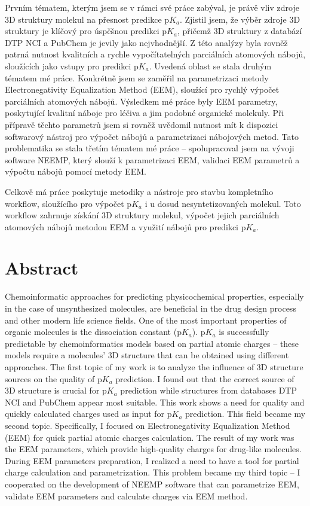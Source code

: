 \documentclass[11pt,b5paper,oneside,final]{book}
\begin{document}
Prvním tématem, kterým jsem se v rámci své práce zabýval, je právě vliv zdroje
3D struktury molekul na přesnost predikce p$K_a$. Zjistil jsem, že výběr zdroje
3D struktury je klíčový pro úspěšnou predikci p$K_a$, přičemž 3D struktury
z databází DTP NCI a PubChem je jevily jako nejvhodnější. Z této analýzy byla
rovněž patrná nutnost kvalitních a rychle vypočítatelných parciálních atomových
nábojů, sloužících jako vstupy pro predikci p$K_a$. Uvedená oblast se stala
druhým tématem mé práce. Konkrétně jsem se zaměřil na parametrizaci metody
Electronegativity Equalization Method (EEM), sloužící pro rychlý vý\-po\-čet
parciálních atomových nábojů. Výsledkem mé práce byly EEM parametry,
poskytující kvalitní náboje pro léčiva a jim podobné organické molekuly.
Při přípravě těchto parametrů jsem si
rovněž uvědomil nutnost mít k dispozici softwarový nástroj pro výpočet nábojů a
pa\-ra\-me\-tri\-za\-ci nábojových metod. Tato problematika se stala třetím tématem mé
práce -- spo\-lu\-pra\-co\-val jsem na vývoji software NEEMP, který slouží
k parametrizaci EEM, validaci EEM parametrů a výpočtu nábojů pomocí metody EEM.

Celkově má práce poskytuje metodiky a nástroje pro stavbu kompletního workflow,
sloužícího pro výpočet p$K_a$ i u dosud nesyntetizovaných molekul. Toto workflow
zahrnuje získání 3D struktury molekul, výpočet jejich parciálních atomových
nábojů metodou EEM a využití nábojů pro predikci p$K_a$.
\clearpage

\section*{Abstract}
Chemoinformatic approaches for predicting physicochemical properties, especially
in the case of unsynthesized molecules, are beneficial in the drug design
process and other modern life science fields. One of the most important
properties of organic molecules is the dissociation constant (p$K_a$). p$K_a$ is
successfully predictable by chemoinformatics models based on partial atomic
charges -- these models require a molecules’ 3D structure that can be obtained
using different approaches. The first topic of my work is to analyze
  the influence of 3D structure sources on the quality of p$K_a$ prediction. I found
out that the correct source of 3D structure is crucial for p$K_a$ prediction
while structures from databases DTP NCI and PubChem appear most suitable. This
work shows a need for quality and quickly calculated charges used as input for
p$K_a$ prediction. This field became my second topic. Specifically, I focused
on Electronegativity Equalization Method (EEM) for quick partial atomic charges
calculation. The result of my work was the EEM parameters, which provide
high-quality charges for drug-like molecules. During EEM parameters preparation,
I realized a need to have a tool for partial charge calculation and
parametrization. This problem became my third topic -- I cooperated
on the development of NEEMP software that can parametrize EEM, validate EEM
parameters and calculate charges via EEM method.
\end{document}
